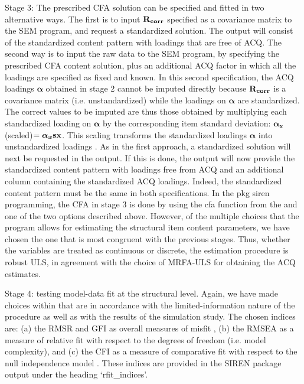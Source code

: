 Stage 3: The prescribed CFA solution can be specified and fitted in two alternative ways. The first is to input $\bf{R_{corr}}$ specified as a covariance matrix to the SEM program, and request a standardized solution. The output will consist of the standardized content pattern with loadings that are free of ACQ. The second way is to input the raw data to the SEM program, by specifying the prescribed CFA content solution, plus an additional ACQ factor in which all the loadings are specified as fixed and known. In this second specification, the ACQ loadings $\boldsymbol{\alpha}$ obtained in stage 2 cannot be imputed directly because $\bf{R_{corr}}$ is a covariance matrix (i.e. unstandardized) while the loadings on $\boldsymbol{\alpha}$ are standardized. The correct values to be imputed are thus those obtained by multiplying each standardized loading on $\boldsymbol{\alpha}$  by the corresponding item standard deviation: $\boldsymbol{\alpha_{x}}$(scaled)$=\boldsymbol{\alpha_{x}}\bf{sx}$. This scaling transforms the standardized loadings $\boldsymbol{\alpha}$ into unstandardized loadings \citep[e.g.][]{Bollen:1989}. As in the first approach, a standardized solution will next be requested in the output. If this is done, the output will now  provide the standardized content pattern with loadings free from ACQ and an additional column containing the standardized ACQ loadings. Indeed, the standardized content pattern must be the same in both specifications. In the pkg {siren} programming, the CFA in stage 3 is done by using the cfa function from the  and one of the two options described above. However, of the multiple choices that the program allows for estimating the structural item content parameters, we have chosen the one that is most congruent with the previous stages. Thus, whether the variables are treated as continuous or discrete, the estimation procedure is robust ULS, in agreement with the choice of MRFA-ULS for obtaining the ACQ estimates.

Stage 4: testing model-data fit at the structural level. Again, we have made choices within  that are in accordance with the limited-information nature of the procedure as well as with the results of the simulation study. The chosen indices are: (a) the RMSR and GFI as overall measures of misfit \citep{McDonald:1995}, (b) the RMSEA as a measure of relative fit with respect to the degrees of freedom (i.e. model complexity), and (c) the CFI as a measure of comparative fit with respect to the null independence model \citep[see][for points b and c]{Tanaka:1993}. These indices are provided in the SIREN package output under the heading ‘rfit\_indices’.

